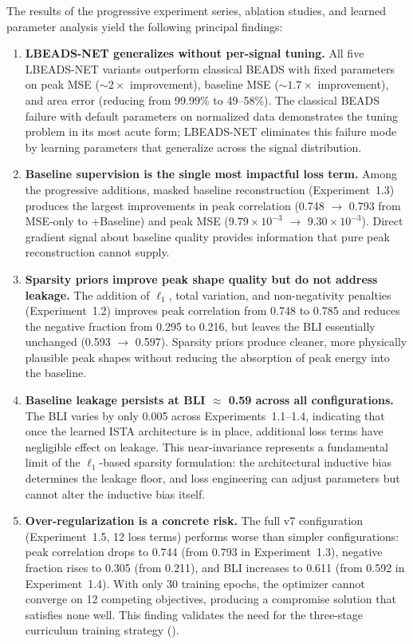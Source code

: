 The results of the progressive experiment series, ablation studies, and learned parameter analysis yield the following principal findings:

\begin{enumerate}
    \item \textbf{LBEADS-NET generalizes without per-signal tuning.} All five LBEADS-NET variants outperform classical BEADS with fixed parameters on peak MSE (${\sim}2\times$ improvement), baseline MSE (${\sim}1.7\times$ improvement), and area error (reducing from 99.99\% to 49--58\%). The classical BEADS failure with default parameters on normalized data demonstrates the tuning problem in its most acute form; LBEADS-NET eliminates this failure mode by learning parameters that generalize across the signal distribution.

    \item \textbf{Baseline supervision is the single most impactful loss term.} Among the progressive additions, masked baseline reconstruction (Experiment~1.3) produces the largest improvements in peak correlation (0.748 $\to$ 0.793 from MSE-only to +Baseline) and peak MSE ($9.79 \times 10^{-3}$ $\to$ $9.30 \times 10^{-3}$). Direct gradient signal about baseline quality provides information that pure peak reconstruction cannot supply.

    \item \textbf{Sparsity priors improve peak shape quality but do not address leakage.} The addition of $\ell_1$, total variation, and non-negativity penalties (Experiment~1.2) improves peak correlation from 0.748 to 0.785 and reduces the negative fraction from 0.295 to 0.216, but leaves the BLI essentially unchanged (0.593 $\to$ 0.597). Sparsity priors produce cleaner, more physically plausible peak shapes without reducing the absorption of peak energy into the baseline.

    \item \textbf{Baseline leakage persists at BLI $\approx$ 0.59 across all configurations.} The BLI varies by only 0.005 across Experiments~1.1--1.4, indicating that once the learned ISTA architecture is in place, additional loss terms have negligible effect on leakage. This near-invariance represents a fundamental limit of the $\ell_1$-based sparsity formulation: the architectural inductive bias determines the leakage floor, and loss engineering can adjust parameters but cannot alter the inductive bias itself.

    \item \textbf{Over-regularization is a concrete risk.} The full v7 configuration (Experiment~1.5, 12 loss terms) performs worse than simpler configurations: peak correlation drops to 0.744 (from 0.793 in Experiment~1.3), negative fraction rises to 0.305 (from 0.211), and BLI increases to 0.611 (from 0.592 in Experiment~1.4). With only 30 training epochs, the optimizer cannot converge on 12 competing objectives, producing a compromise solution that satisfies none well. This finding validates the need for the three-stage curriculum training strategy ().


\end{enumerate}

